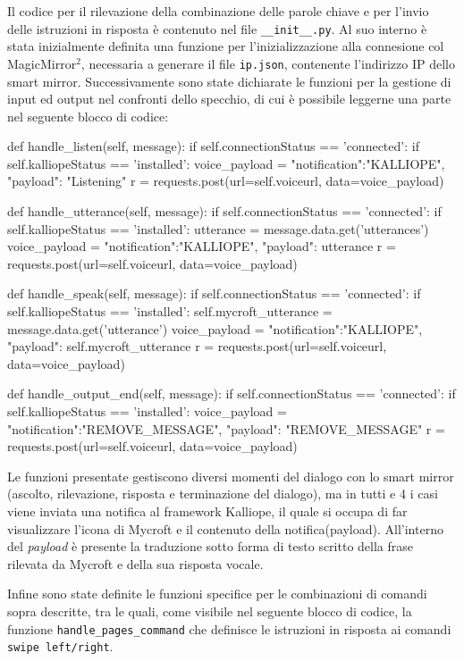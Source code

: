 \documentclass[12pt,a4paper]{article}
\begin{document}
Il codice per il rilevazione della combinazione delle parole chiave e per l'invio delle istruzioni in risposta \`e
contenuto nel file \verb|__init__.py|. Al suo interno \`e stata inizialmente definita una funzione per
l'inizializzazione alla connesione col MagicMirror$^2$, necessaria a generare il file \verb|ip.json|, contenente
l'indirizzo IP dello smart mirror. Successivamente sono state dichiarate le funzioni per la gestione di input ed output
nel confronti dello specchio, di cui \`e possibile leggerne una parte nel seguente blocco di codice:
\begin{MyVerbatim}
def handle_listen(self, message):
if self.connectionStatus == 'connected':
    if self.kalliopeStatus == 'installed':
        voice_payload = {"notification":"KALLIOPE", "payload": "Listening"}
        r = requests.post(url=self.voiceurl, data=voice_payload)

def handle_utterance(self, message):
if self.connectionStatus == 'connected':
    if self.kalliopeStatus == 'installed':
        utterance = message.data.get('utterances')
        voice_payload = {"notification":"KALLIOPE", "payload": utterance}
        r = requests.post(url=self.voiceurl, data=voice_payload)
\end{MyVerbatim}
\begin{MyVerbatim}
def handle_speak(self, message):
if self.connectionStatus == 'connected':
    if self.kalliopeStatus == 'installed':
        self.mycroft_utterance = message.data.get('utterance')
        voice_payload = {"notification":"KALLIOPE", "payload": self.mycroft_utterance}
        r = requests.post(url=self.voiceurl, data=voice_payload)

def handle_output_end(self, message):
if self.connectionStatus == 'connected':
    if self.kalliopeStatus == 'installed':
        voice_payload = {"notification":"REMOVE_MESSAGE", "payload": "REMOVE_MESSAGE"}
        r = requests.post(url=self.voiceurl, data=voice_payload)
\end{MyVerbatim}
Le funzioni presentate gestiscono diversi momenti del dialogo con lo smart mirror (ascolto, rilevazione, risposta e terminazione del dialogo),
ma in tutti e 4 i casi viene inviata una notifica al framework Kalliope, il quale si occupa di far visualizzare l'icona di Mycroft
e il contenuto della notifica(payload). All'interno del \textit{payload} \`e presente la traduzione sotto forma di testo scritto
della frase rilevata da Mycroft e della sua risposta vocale.

Infine sono state definite le funzioni specifice per le combinazioni di comandi sopra descritte, tra le quali, come visibile nel seguente blocco
di codice, la funzione \verb|handle_pages_command| che definisce le istruzioni in risposta ai comandi \verb|swipe left/right|.
\end{document}

